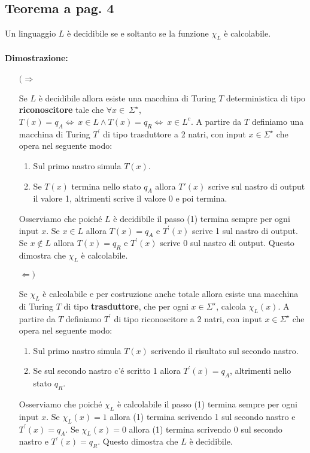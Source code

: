 \subsection{Teorema a pag. 4}
Un linguaggio $L$ è decidibile se e soltanto se la funzione $\chi_{L}$ è calcolabile.

\paragraph*{Dimostrazione:}
\begin{itemize}
    \item[$(\Rightarrow$]{
        Se $L$ è decidibile allora esiste una macchina di Turing $T$ deterministica di tipo \textbf{riconoscitore} tale che $\forall x\in\ \Sigma^{\star}$, $T(x) = q_{A} \Leftrightarrow\ x\in L \land T(x) = q_{R} \Leftrightarrow\ x\in L^{c}$.
        A partire da $T$ definiamo una macchina di Turing $T^{'}$ di tipo trasduttore a 2 natri, con input $x\in\Sigma^{\star}$ che opera nel seguente modo:
        \begin{enumerate}
            \item Sul primo nastro simula $T(x)$.
            \item Se $T(x)$ termina nello stato $q_{A}$ allora $T{'}(x)$ scrive sul nastro di output il valore 1, altrimenti scrive il valore 0 e poi termina.
        \end{enumerate}
        Osserviamo che poiché $L$ è decidibile il passo (1) termina sempre per ogni input $x$. Se $x\in L$ allora $T(x) = q_{A}$ e $T^{'}(x)$ scrive 1 sul nastro di output.
        Se $x\notin L$ allora $T(x) = q_{R}$ e $T^{'}(x)$ scrive 0 sul nastro di output. Questo dimostra che $\chi_{L}$ è calcolabile.
    }
    \item[$\Leftarrow)$]{
        Se $\chi_{L}$ è calcolabile e per costruzione anche totale allora esiste una macchina di Turing $T$ di tipo \textbf{trasduttore}, che per ogni $x\in \Sigma^{\star}$, calcola $\chi_{L}(x)$.
        A partire da $T$ definiamo $T^{'}$ di tipo riconoscitore a 2 natri, con input $x\in\Sigma^{\star}$ che opera nel seguente modo:
        \begin{enumerate}
            \item Sul primo nastro simula $T(x)$ scrivendo il risultato sul secondo nastro.
            \item Se sul secondo nastro c'é scritto 1 allora $T^{'}(x) = q_{A}$, altrimenti nello stato $q_{R}$.
        \end{enumerate}
        Osserviamo che poiché $\chi_{L}$ è calcolabile il passo (1) termina sempre per ogni input $x$. Se $\chi_{L}(x) = 1$ allora (1) termina scrivendo 1 sul secondo nastro e $T^{'}(x) = q_{A}$.
        Se $\chi_{L}(x) = 0$ allora (1) termina scrivendo 0 sul secondo nastro e $T^{'}(x) = q_{R}$. Questo dimostra che $L$ è decidibile.
    }
\end{itemize}
\newpage
